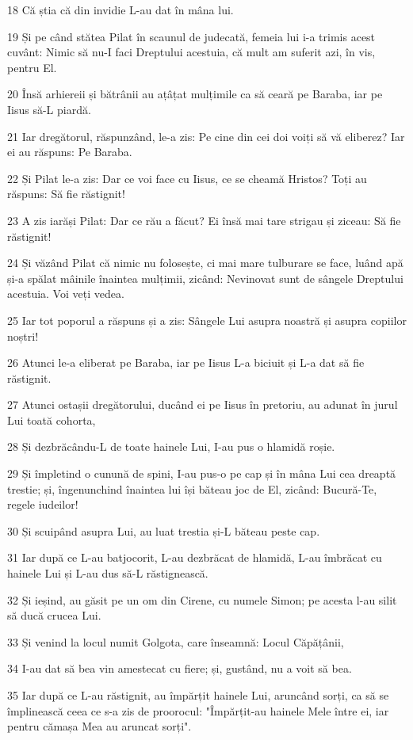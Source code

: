 \par 18 Că știa că din invidie L-au dat în mâna lui.
\par 19 Și pe când stătea Pilat în scaunul de judecată, femeia lui i-a trimis acest cuvânt: Nimic să nu-I faci Dreptului acestuia, că mult am suferit azi, în vis, pentru El.
\par 20 Însă arhiereii și bătrânii au ațâțat mulțimile ca să ceară pe Baraba, iar pe Iisus să-L piardă.
\par 21 Iar dregătorul, răspunzând, le-a zis: Pe cine din cei doi voiți să vă eliberez? Iar ei au răspuns: Pe Baraba.
\par 22 Și Pilat le-a zis: Dar ce voi face cu Iisus, ce se cheamă Hristos? Toți au răspuns: Să fie răstignit!
\par 23 A zis iarăși Pilat: Dar ce rău a făcut? Ei însă mai tare strigau și ziceau: Să fie răstignit!
\par 24 Și văzând Pilat că nimic nu folosește, ci mai mare tulburare se face, luând apă și-a spălat mâinile înaintea mulțimii, zicând: Nevinovat sunt de sângele Dreptului acestuia. Voi veți vedea.
\par 25 Iar tot poporul a răspuns și a zis: Sângele Lui asupra noastră și asupra copiilor noștri!
\par 26 Atunci le-a eliberat pe Baraba, iar pe Iisus L-a biciuit și L-a dat să fie răstignit.
\par 27 Atunci ostașii dregătorului, ducând ei pe Iisus în pretoriu, au adunat în jurul Lui toată cohorta,
\par 28 Și dezbrăcându-L de toate hainele Lui, I-au pus o hlamidă roșie.
\par 29 Și împletind o cunună de spini, I-au pus-o pe cap și în mâna Lui cea dreaptă trestie; și, îngenunchind înaintea lui își băteau joc de El, zicând: Bucură-Te, regele iudeilor!
\par 30 Și scuipând asupra Lui, au luat trestia și-L băteau peste cap.
\par 31 Iar după ce L-au batjocorit, L-au dezbrăcat de hlamidă, L-au îmbrăcat cu hainele Lui și L-au dus să-L răstignească.
\par 32 Și ieșind, au găsit pe un om din Cirene, cu numele Simon; pe acesta l-au silit să ducă crucea Lui.
\par 33 Și venind la locul numit Golgota, care înseamnă: Locul Căpățânii,
\par 34 I-au dat să bea vin amestecat cu fiere; și, gustând, nu a voit să bea.
\par 35 Iar după ce L-au răstignit, au împărțit hainele Lui, aruncând sorți, ca să se împlinească ceea ce s-a zis de proorocul: "Împărțit-au hainele Mele între ei, iar pentru cămașa Mea au aruncat sorți".
